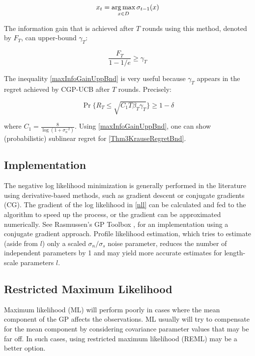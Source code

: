 \begin{equation}
x_{t} = \operatorname*{arg\, max}_{x \in D} \sigma_{t-1}(x)
\end{equation}

The information gain that is achieved after $T$ rounds using this method, denoted by $F_{T}$, can upper-bound $\gamma_{T}$:

\begin{equation}
\frac{F_{T}}{1 - 1/e} \geq \gamma_{T} \label{maxInfoGainUppBnd}
\end{equation}

The inequality \eqref{maxInfoGainUppBnd} is very useful because $\gamma_{T}$ appears in the regret achieved by CGP-UCB after $T$ rounds. Precisely:

\begin{equation}
\Pr \lbrace R_{T} \leq \sqrt{C_{1}T\beta_{T}\gamma_{T}} \rbrace \geq 1 - \delta \label{Thm3KrauseRegretBnd}
\end{equation}

where $C_{1} = \frac{8}{\log(1 + \sigma_{n}^{-2})}$. Using \eqref{maxInfoGainUppBnd}, one can show (probabilistic) sublinear regret for \eqref{Thm3KrauseRegretBnd}.

\subsection*{Implementation}

The negative log likelihood minimization is generally performed in the literature using derivative-based methods, such as gradient descent or conjugate gradients (CG). The gradient of the log likelihood in \eqref{nll} can be calculated and fed to the algorithm to speed up the process, or the gradient can be approximated numerically. See Rasmussen's GP Toolbox \cite{GPML}, for an implementation using a conjugate gradient approach. Profile likelihood estimation, which tries to estimate (aside from $l$) only a scaled $\sigma_n / \sigma_s$ noise parameter, reduces the number of independent parameters by 1 and may yield more accurate estimates for length-scale parameters $l$.

\subsection{Restricted Maximum Likelihood}

Maximum likelihood (ML) will perform poorly in cases where the mean component of the GP affects the observations. ML usually will try to compensate for the mean component by considering covariance parameter values that may be far off. In such cases, using restricted maximum likelihood (REML) may be a better option. 

